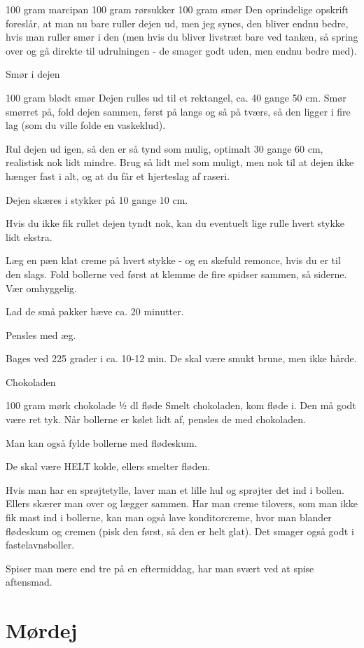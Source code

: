 \documentclass[
  letterpaper,
  DIV=11,
  numbers=noendperiod]{scrreprt}
\begin{document}
100 gram marcipan 100 gram rørsukker 100 gram smør Den oprindelige
opskrift foreslår, at man nu bare ruller dejen ud, men jeg synes, den
bliver endnu bedre, hvis man ruller smør i den (men hvis du bliver
livstræt bare ved tanken, så spring over og gå direkte til udrulningen -
de smager godt uden, men endnu bedre med).

Smør i dejen

100 gram blødt smør Dejen rulles ud til et rektangel, ca. 40 gange 50
cm. Smør smørret på, fold dejen sammen, først på langs og så på tværs,
så den ligger i fire lag (som du ville folde en vaskeklud).

Rul dejen ud igen, så den er så tynd som mulig, optimalt 30 gange 60 cm,
realistisk nok lidt mindre. Brug så lidt mel som muligt, men nok til at
dejen ikke hænger fast i alt, og at du får et hjerteslag af raseri.

Dejen skæres i stykker på 10 gange 10 cm.

Hvis du ikke fik rullet dejen tyndt nok, kan du eventuelt lige rulle
hvert stykke lidt ekstra.

Læg en pæn klat creme på hvert stykke - og en skefuld remonce, hvis du
er til den slags. Fold bollerne ved først at klemme de fire spidser
sammen, så siderne. Vær omhyggelig.

Lad de små pakker hæve ca. 20 minutter.

Pensles med æg.

Bages ved 225 grader i ca. 10-12 min. De skal være smukt brune, men ikke
hårde.

Chokoladen

100 gram mørk chokolade ½ dl fløde Smelt chokoladen, kom fløde i. Den må
godt være ret tyk. Når bollerne er kølet lidt af, pensles de med
chokoladen.

Man kan også fylde bollerne med flødeskum.

De skal være HELT kolde, ellers smelter fløden.

Hvis man har en sprøjtetylle, laver man et lille hul og sprøjter det ind
i bollen. Ellers skærer man over og lægger sammen. Har man creme
tilovers, som man ikke fik mast ind i bollerne, kan man også lave
konditorcreme, hvor man blander flødeskum og cremen (pisk den først, så
den er helt glat). Det smager også godt i fastelavnsboller.

Spiser man mere end tre på en eftermiddag, har man svært ved at spise
aftensmad.

\hypertarget{muxf8rdej-1}{%
\section{Mørdej}\label{muxf8rdej-1}}
\end{document}
